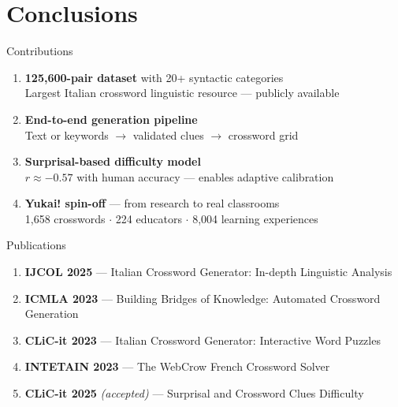 \section*{Conclusions}

\begin{frame}{Contributions}
  \begin{enumerate}
    \setlength\itemsep{0.7em}
    \item \textbf{125,600-pair dataset} with 20+ syntactic categories\\
          {\scriptsize\color{graytext} Largest Italian crossword linguistic resource --- publicly available}

    \item \textbf{End-to-end generation pipeline}\\
          {\scriptsize\color{graytext} Text or keywords $\rightarrow$ validated clues $\rightarrow$ crossword grid}

    \item \textbf{Surprisal-based difficulty model}\\
          {\scriptsize\color{graytext} $r \approx -0.57$ with human accuracy --- enables adaptive calibration}

    \item \textbf{Yukai! spin-off} --- from research to real classrooms\\
          {\scriptsize\color{graytext} 1,658 crosswords $\cdot$ 224 educators $\cdot$ 8,004 learning experiences}
  \end{enumerate}
\end{frame}

\begin{frame}{Publications}
  \small
  \begin{enumerate}
    \setlength\itemsep{0.55em}
    \item \textbf{IJCOL 2025} --- Italian Crossword Generator: In-depth Linguistic Analysis
    \item \textbf{ICMLA 2023} --- Building Bridges of Knowledge: Automated Crossword Generation
    \item \textbf{CLiC-it 2023} --- Italian Crossword Generator: Interactive Word Puzzles
    \item \textbf{INTETAIN 2023} --- The WebCrow French Crossword Solver
    \item \textbf{CLiC-it 2025} \textit{(accepted)} --- Surprisal and Crossword Clues Difficulty
  \end{enumerate}
\end{frame}